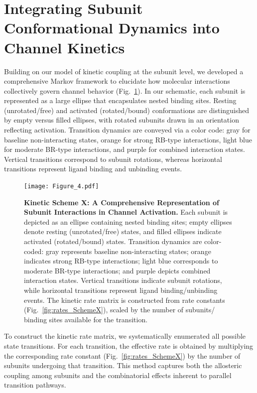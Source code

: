 \documentclass[pdflatex,sn-nature]{sn-jnl}%
\begin{document}
\section{Integrating Subunit Conformational Dynamics into Channel Kinetics}
Building on our model of kinetic coupling at the subunit level, we developed a comprehensive Markov framework to elucidate how molecular interactions collectively govern channel behavior (Fig.~\ref{fig:SchemeX_full}). In our schematic, each subunit is represented as a large ellipse that encapsulates nested binding sites. Resting (unrotated/free) and activated (rotated/bound) conformations are distinguished by empty versus filled ellipses, with rotated subunits drawn in an orientation reflecting activation. Transition dynamics are conveyed via a color code: gray for baseline non-interacting states, orange for strong RB-type interactions, light blue for moderate BR-type interactions, and purple for combined interaction states. Vertical transitions correspond to subunit rotations, whereas horizontal transitions represent ligand binding and unbinding events.

\begin{figure}[!htbp]
	\centering
	\texttt{[image: Figure\_4.pdf]}
	\caption{\textbf{Kinetic Scheme X: A Comprehensive Representation of Subunit Interactions in Channel Activation.} Each subunit is depicted as an ellipse containing nested binding sites; empty ellipses denote resting (unrotated/free) states, and filled ellipses indicate activated (rotated/bound) states. Transition dynamics are color-coded: gray represents baseline non-interacting states; orange indicates strong RB-type interactions; light blue corresponds to moderate BR-type interactions; and purple depicts combined interaction states. Vertical transitions indicate subunit rotations, while horizontal transitions represent ligand binding/unbinding events. The kinetic rate matrix is constructed from rate constants (Fig.~\ref{fig:rates_SchemeX}), scaled by the number of subunits/ binding sites available for the transition.}
	\label{fig:SchemeX_full}
\end{figure}

To construct the kinetic rate matrix, we systematically enumerated all possible state transitions. For each transition, the effective rate is obtained by multiplying the corresponding rate constant (Fig.~\ref{fig:rates_SchemeX}) by the number of subunits undergoing that transition. This method captures both the allosteric coupling among subunits and the combinatorial effects inherent to parallel transition pathways.
\end{document}
